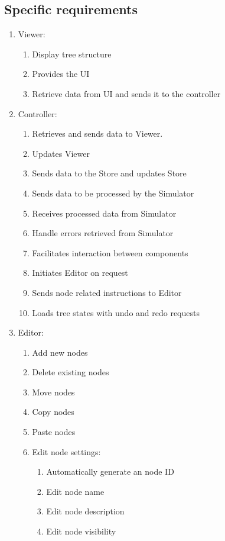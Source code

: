 \documentclass[12pt]{article}
\begin{document}
  \subsection{Specific requirements}
  \begin{enumerate}
  \item Viewer:
    \begin{enumerate}
      \item Display tree structure
      \item Provides the UI
      \item Retrieve data from UI and sends it to the controller
    \end{enumerate}
    \item Controller:
    \begin{enumerate}
      \item Retrieves and sends data to Viewer.
      \item Updates Viewer
      \item Sends data to the Store and updates Store
      \item Sends data to be processed by the Simulator
      \item Receives processed data from Simulator
      \item Handle errors retrieved from Simulator
      \item Facilitates interaction between components
      \item Initiates Editor on request
      \item Sends node related instructions to Editor
      \item Loads tree states with undo and redo requests
    \end{enumerate}
    \item Editor:
    \begin{enumerate}
      \item Add new nodes
      \item Delete existing nodes
      \item Move nodes
      \item Copy nodes
      \item Paste nodes
      \item Edit node settings:
      \begin{enumerate}
        \item Automatically generate an node ID
        \item Edit node name
        \item Edit node description
        \item Edit node visibility

\end{enumerate}
\end{enumerate}
\end{enumerate}
\end{document}
